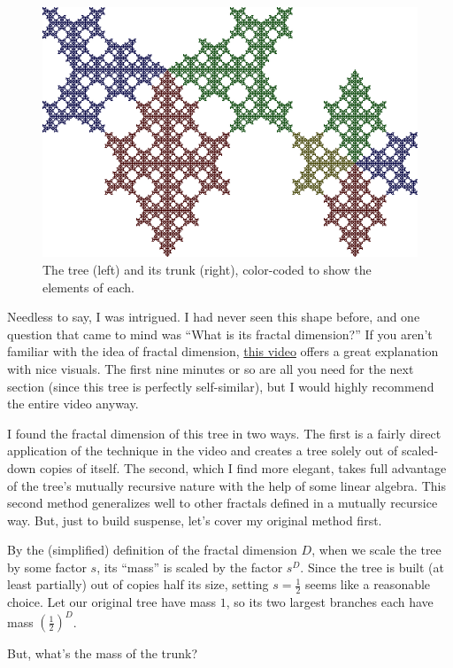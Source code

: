 \documentclass{article}
\begin{document}
\begin{figure}[H]
  \centering
  \includegraphics[scale=0.125]{tree_colored.png}
  \caption*{The tree (left) and its trunk (right),
  color-coded to show the elements of each.}
\end{figure}
Needless to say, I was intrigued.
I had never seen this shape before,
and one question that came to mind was
``What is its fractal dimension?''
If you aren't familiar with the idea of fractal dimension,
\href{https://www.youtube.com/watch?v=gB9n2gHsHN4}{this video}
offers a great explanation with nice visuals.
The first nine minutes or so are all you need for the next section
(since this tree is perfectly self-similar),
but I would highly recommend the entire video anyway.

I found the fractal dimension of this tree in two ways.
The first is a fairly direct application of the technique in the video
and creates a tree solely out of scaled-down copies of itself.
The second, which I find more elegant,
takes full advantage of the tree's mutually recursive nature
with the help of some linear algebra.
This second method generalizes well to other fractals
defined in a mutually recursice way.
But, just to build suspense,
let's cover my original method first.

By the (simplified) definition of the fractal dimension $D$,
when we scale the tree by some factor $s$,
its ``mass'' is scaled by the factor $s^D$.
Since the tree is built (at least partially) out of copies half its size,
setting $s=\frac{1}{2}$ seems like a reasonable choice.
Let our original tree have mass $1$,
so its two largest branches each have mass $(\frac{1}{2})^D$.

But, what's the mass of the trunk?
\end{document}
